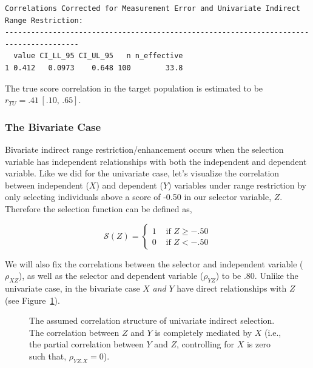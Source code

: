 \documentclass[
  letterpaper,
  DIV=11,
  numbers=noendperiod]{scrreprt}
\begin{document}
\begin{tcolorbox}
\begin{verbatim}
Correlations Corrected for Measurement Error and Univariate Indirect Range Restriction:
---------------------------------------------------------------------------------------
  value CI_LL_95 CI_UL_95   n n_effective
1 0.412   0.0973    0.648 100        33.8
\end{verbatim}

The true score correlation in the target population is estimated to be
\(r_{TU} = .41\, [.10,\, .65]\).

\end{tcolorbox}

\subsubsection*{The Bivariate Case}\label{the-bivariate-case-2}

Bivariate indirect range restriction/enhancement occurs when the
selection variable has independent relationships with both the
independent and dependent variable. Like we did for the univariate case,
let's visualize the correlation between independent (\(X\)) and
dependent (\(Y\)) variables under range restriction by only selecting
individuals above a score of -0.50 in our selector variable, \(Z\).
Therefore the selection function can be defined as,

\[
\mathcal{S}(Z)=\begin{cases} 1 &\text{ if } Z \geq-.50 \\  0 &\text{ if } Z <-.50  \end{cases}
\]

We will also fix the correlations between the selector and independent
variable (\(\rho_{XZ}\)), as well as the selector and dependent variable
(\(\rho_{YZ}\)) to be .80. Unlike the univariate case, in the bivariate
case \(X\) \emph{and} \(Y\) have direct relationships with \(Z\) (see
Figure~\ref{fig-corr-model-biv}).

\begin{figure}[H]


\caption{\label{fig-corr-model-biv}The assumed correlation structure of
univariate indirect selection. The correlation between \(Z\) and \(Y\)
is completely mediated by \(X\) (i.e., the partial correlation between
\(Y\) and \(Z\), controlling for \(X\) is zero such that,
\(\rho_{YZ.X}=0\)).}

\end{figure}%
\end{document}
